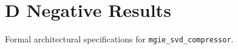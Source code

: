 \section{D Negative Results}

Formal architectural specifications for \texttt{mgie_svd_compressor}.
